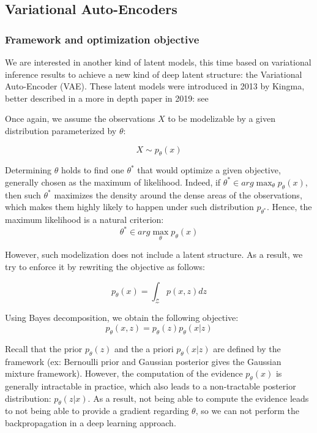 \subsection{Variational Auto-Encoders}

\subsubsection{Framework and optimization objective}

We are interested in another kind of latent models, this time based on variational inference
results to achieve a new kind of deep latent structure: the Variational Auto-Encoder (VAE).
These latent models were introduced in 2013 by Kingma, better described in a more in depth paper in 2019: see \cite{kingma2019introduction}

Once again, we assume the observations $X$ to be modelizable by a given distribution
parameterized by $\theta$:

$$
X \sim p_{\theta}(x)
$$

Determining $\theta$ holds to find one $\theta^*$ that would optimize a given objective, generally chosen as the maximum of likelihood. Indeed, if $\theta^* \in arg\max_{\theta} p_{\theta}(x)$, then such $\theta^*$ maximizes the density around the dense areas of the observations, which makes them highly likely to happen under such distribution $p_{\theta^*}$. Hence, the maximum likelihood is a natural criterion:
$$
\theta^* \in arg\max_{\theta} p_{\theta}(x)
$$

However, such modelization does not include a latent structure.
As a result, we try to enforce it by rewriting the objective as follows:

$$
p_{\theta}(x) = \int_{\mathcal{Z}} p(x,z) dz 
$$

Using Bayes decomposition, we obtain the following objective:
$$
p_{\theta}(x,z) = p_{\theta}(z) p_{\theta}(x|z)
$$

Recall that the prior $p_{\theta}(z)$ and the a priori $p_{\theta}(x|z)$ are defined by the framework (ex: Bernoulli prior and Gaussian posterior gives the Gaussian mixture framework). However, the computation of the evidence $p_{\theta}(x)$ is generally intractable in practice, which also leads to a non-tractable posterior distribution: $p_{\theta}(z|x)$. As a result, not being able to compute the evidence leads to not being able to provide a gradient regarding $\theta$, so we can not perform the backpropagation in a deep learning approach.

